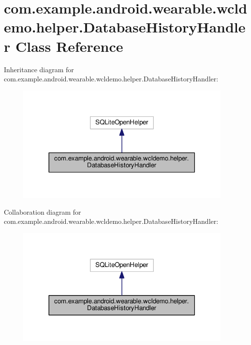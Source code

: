 \hypertarget{classcom_1_1example_1_1android_1_1wearable_1_1wcldemo_1_1helper_1_1DatabaseHistoryHandler}{}\section{com.\+example.\+android.\+wearable.\+wcldemo.\+helper.\+Database\+History\+Handler Class Reference}
\label{classcom_1_1example_1_1android_1_1wearable_1_1wcldemo_1_1helper_1_1DatabaseHistoryHandler}


Inheritance diagram for com.\+example.\+android.\+wearable.\+wcldemo.\+helper.\+Database\+History\+Handler\+:\nopagebreak
\begin{figure}[H]
\begin{center}
\leavevmode
\includegraphics[width=306pt]{d3/dc8/classcom_1_1example_1_1android_1_1wearable_1_1wcldemo_1_1helper_1_1DatabaseHistoryHandler__inherit__graph}
\end{center}
\end{figure}


Collaboration diagram for com.\+example.\+android.\+wearable.\+wcldemo.\+helper.\+Database\+History\+Handler\+:\nopagebreak
\begin{figure}[H]
\begin{center}
\leavevmode
\includegraphics[width=306pt]{d2/dea/classcom_1_1example_1_1android_1_1wearable_1_1wcldemo_1_1helper_1_1DatabaseHistoryHandler__coll__graph}
\end{center}
\end{figure}
